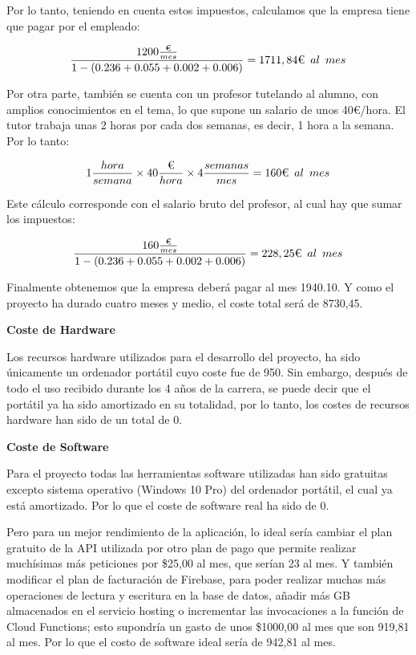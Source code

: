 
Por lo tanto, teniendo en cuenta estos impuestos, calculamos que la empresa tiene que pagar por el empleado:

$$ \frac{1200\frac{\text{€}}{mes}}{1-(0.236+0.055+0.002+0.006)}=1711,84\text{€}\hspace{0.5em}al\hspace{0.5em}mes $$

Por otra parte, también se cuenta con un profesor tutelando al alumno, con amplios conocimientos en el tema, lo que supone un salario de unos 40€/hora. El tutor trabaja unas 2 horas por cada dos semanas, es decir, 1 hora a la semana. Por lo tanto:

$$ 1\frac{hora}{semana}\times40\frac{\text{€}}{hora}\times4\frac{semanas}{mes}=160\text{€}\hspace{0.5em}al\hspace{0.5em}mes $$

Este cálculo corresponde con el salario bruto del profesor, al cual hay que sumar los impuestos:

$$ \frac{160\frac{\text{€}}{mes}}{1-(0.236+0.055+0.002+0.006)}=228,25\text{€}\hspace{0.5em}al\hspace{0.5em}mes $$

Finalmente obtenemos que la empresa deberá pagar al mes 1940.10. Y como el proyecto ha durado cuatro meses y medio, el coste total será de 8730,45.

\hfill

\textbf{Coste de Hardware}

Los recursos hardware utilizados para el desarrollo del proyecto, ha sido únicamente un ordenador portátil cuyo coste fue de 950. Sin embargo, después de todo el uso recibido durante los 4 años de la carrera, se puede decir que el portátil ya ha sido amortizado en su totalidad, por lo tanto, los costes de recursos hardware han sido de un total de 0.

\hfill

\textbf{Coste de Software}

Para el proyecto todas las herramientas software utilizadas han sido gratuitas excepto sistema operativo (Windows 10 Pro) del ordenador portátil, el cual ya está amortizado. Por lo que el coste de software real ha sido de 0.

Pero para un mejor rendimiento de la aplicación, lo ideal sería cambiar el plan gratuito de la API utilizada por otro plan de pago que permite realizar muchísimas más peticiones por \$25,00 al mes, que serían 23 al mes. Y también modificar el plan de facturación de Firebase, para poder realizar muchas más operaciones de lectura y escritura  en la base de datos, añadir más GB almacenados en el servicio hosting o incrementar las invocaciones a la función de Cloud Functions; esto supondría un gasto de unos \$1000,00 al mes que son 919,81 al mes. Por lo que el costo de software ideal sería de 942,81 al mes.

